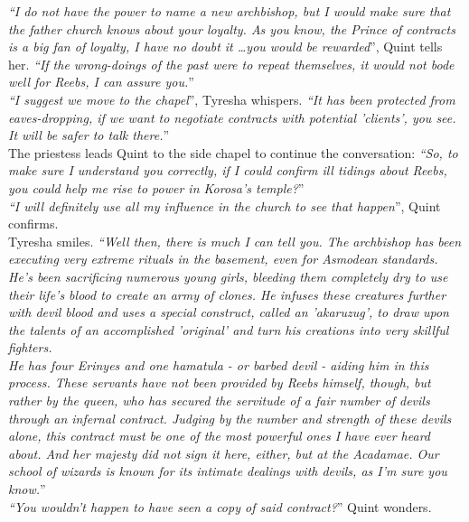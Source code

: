 {\itshape``I do not have the power to name a new archbishop, but I would make sure that the father church knows about your loyalty. As you know, the Prince of contracts is a big fan of loyalty, I have no doubt it \ldots you would be rewarded}'', Quint tells her. {\itshape``If the wrong-doings of the past were to repeat themselves, it would not bode well for Reebs, I can assure you.}''\\

{\itshape``I suggest we move to the chapel}'', Tyresha whispers. {\itshape``It has been protected from eaves-dropping, if we want to negotiate contracts with potential 'clients', you see. It will be safer to talk there.}''\\

The priestess leads Quint to the side chapel to continue the conversation: {\itshape``So, to make sure I understand you correctly, if I could confirm ill tidings about Reebs, you could help me rise to power in Korosa's temple?}''\\

{\itshape``I will definitely use all my influence in the church to see that happen}'', Quint confirms.\\

Tyresha smiles. {\itshape``Well then, there is much I can tell you. The archbishop has been executing very extreme rituals in the basement, even for Asmodean standards. He's been sacrificing numerous young girls, bleeding them completely dry to use their life's blood to create an army of clones. He infuses these creatures further with devil blood and uses a special construct, called an 'akaruzug', to draw upon the talents of an accomplished 'original' and turn his creations into very skillful fighters.\\

He has four Erinyes and one hamatula - or barbed devil - aiding him in this process. These servants have not been provided by Reebs himself, though, but rather by the queen, who has secured the servitude of a fair number of devils through an infernal contract. Judging by the number and strength of these devils alone, this contract must be one of the most powerful ones I have ever heard about. And her majesty did not sign it here, either, but at the Acadamae. Our school of wizards is known for its intimate dealings with devils, as I'm sure you know.}''\\

{\itshape``You wouldn't happen to have seen a copy of said contract?}'' Quint wonders.\\

